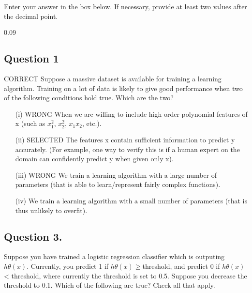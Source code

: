 \documentclass[11pt]{article} %
\begin{document}
Enter your answer in the box below. If necessary, provide at least two values after the decimal point.

0.09
\subsection{Question 1} 
CORRECT
Suppose a massive dataset is available for training a learning algorithm. Training on a lot of data is likely to give good performance when two of the following conditions hold true. Which are the two?

\begin{itemize}
	\item[(i)] WRONG When we are willing to include high order polynomial features of x (such as $x^2_1$, $x^2_2$, $x_1x_2$, etc.).
	
\item[(ii)]	SELECTED The features x contain sufficient information to predict y accurately. (For example, one way to verify this is if a human expert on the domain can confidently predict y when given only x).
	
	
\item[(iii)] WRONG  We train a learning algorithm with a 	large number of parameters (that is able to learn/represent fairly complex functions).
	
	
	
\item[(iv)] 	We train a learning algorithm with a small number of parameters (that is thus unlikely to overfit).
\end{itemize}



\subsection{Question 3.}

Suppose you have trained a logistic regression classifier which is outputing $h\theta(x)$. Currently, you predict 1 if $h\theta(x) \geq $threshold, and predict 0 if $h\theta(x)$ < threshold, where currently the threshold is set to 0.5. Suppose you decrease the threshold to 0.1. Which of the following are true? Check all that apply.
\end{document}
